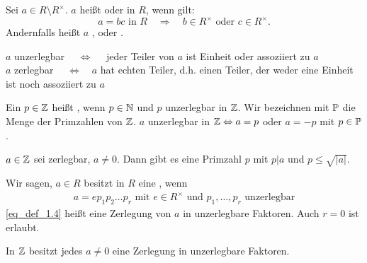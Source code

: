 \setlength{\fboxsep}{10pt}
\setlength{\fboxrule}{3pt}
\begin{center}
\end{center}

\begin{defn} \label{def_1.3}
	Sei $a \in R \setminus R^\times$. $a$ heißt  oder  in $R$, wenn gilt:
	\[ a = bc \text{ in } R \quad \Rightarrow \quad b \in R^\times \text{ oder } c \in R^\times. \]
	Andernfalls heißt $a$ ,  oder .
\end{defn}

	$a$ unzerlegbar $\quad \Leftrightarrow \quad $ jeder Teiler von $a$ ist Einheit oder assoziiert zu $a$ \\
	$a$ zerlegbar $\quad \Leftrightarrow \quad a$ hat echten Teiler, d.h. einen Teiler, der weder eine Einheit ist noch assoziiert zu $a$

\setcounter{defn}{2}
\begin{defn}[Primzahl] \label{def_1.3'}
	Ein $p \in \mathbb{Z}$ heißt , wenn $p \in \mathbb{N}$ und $p$ unzerlegbar in $\mathbb{Z}$. Wir bezeichnen mit $\mathbb{P}$ die Menge der Primzahlen von $\mathbb{Z}$. $a$ unzerlegbar in $\mathbb{Z} \Leftrightarrow a = p$ oder $a = -p$ mit $p \in \mathbb{P}$.
\end{defn}

	$a \in \mathbb{Z}$ sei zerlegbar, $a \neq 0$. Dann gibt es eine Primzahl $p$ mit $p | a$ und $p \leq \sqrt{|a|}$.

\begin{defn} \label{def_1.4}
	Wir sagen, $a \in R$ besitzt in $R$ eine , wenn
	\begin{equation}
	\begin{aligned}
		a = ep_1p_2\dots p_r \text{ mit } e \in R^\times \text{ und } p_1,\dots,p_r \text{ unzerlegbar} \label{eq_def_1.4}
	\end{aligned}
	\end{equation}
	\eqref{eq_def_1.4} heißt eine Zerlegung von $a$ in unzerlegbare Faktoren. Auch $r = 0$ ist erlaubt.
\end{defn}

\begin{falko} \label{F1.3}
	In $\mathbb{Z}$ besitzt jedes $a \neq 0$ eine Zerlegung in unzerlegbare Faktoren.
\end{falko}	

